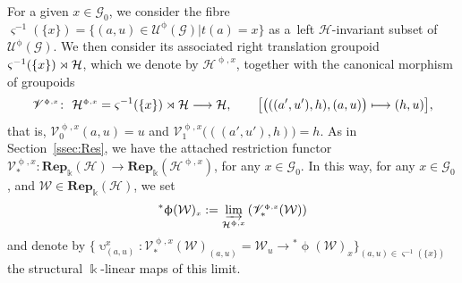 \documentclass[pdftex]{sigma}
\numberwithin{equation}{section}
\newcommand{\Rep}[1]{\mathbf{Rep}_{\Sscript{\Bbbk}}(#1)}
\newcommand{\Go}{\cG_{\Sscript{0}}}
\newcommand{\uU}{\mathscr{U}}
\newcommand{\vV}{\mathscr{V}}
\newcommand{\cG}{{\mathcal G}}
\newcommand{\cH}{{\mathcal H}}
\newcommand{\cW}{{\mathcal W}}
\newcommand{\Sscript}[1]{\scriptscriptstyle{#1}}
\newcommand{\injlimit}[2]{\varinjlim_{#1}\left({#2}\right)}
\newcommand{\upg}{\uU^{\Sscript{\upphi}}(\cG)}
\begin{document}
For a given $x \in\Go$, we consider the fibre $\varsigma^{-1}(\{x\})=\big\{ (a,u) \in \upg| t(a)=x \big\}$ as a~left $\cH$-invariant subset of $\upg$. We then consider its associated right translation groupoid $\varsigma^{-1}(\{x\}) \rJoin \cH$, which we denote by $\cH^{\Sscript{\upphi, x}}$, together with the canonical morphism of groupoids
\begin{gather*}
\vV^{\Sscript{\upphi, x}}\colon \ \cH^{\Sscript{\upphi, x}}= \varsigma^{-1}(\{x\}) \rJoin \cH \longrightarrow \cH, \qquad \big[ \big( ((a',u'),h), (a,u)\big) \longmapsto (h,u) \big],
\end{gather*}
that is, $\vV^{\Sscript{\upphi, x}}_{\Sscript{0}}(a,u)=u$ and $\vV^{\Sscript{\upphi, x}}_{\Sscript{1}}\big( ((a',u'),h) \big)=h$. As in Section~\ref{ssec:Res}, we have the attached restriction
functor $\vV^{\Sscript{\upphi, x}}_*\colon \Rep{\cH} \to \Rep{\cH^{\Sscript\upphi, x}}$, for any $x \in \Go$.
In this way, for any $x \in \Go$, and $\cW \in \Rep{\cH}$, we set\begin{gather}\label{Eq:SPx} {}^*\upphi(\cW)_{\Sscript{x}}: = \injlimit{\cH^{\Sscript{\upphi,
x}}}{\vV^{\Sscript{\upphi, x}}_*(\cW)}
\end{gather}
and denote by $\big\{\upupsilon^{\Sscript{x}}_{\Sscript{(a, u)}}\colon \vV^{\Sscript{\upphi, x}}_*(\cW)_{\Sscript{(a, u)}}=\cW_{\Sscript{u}} \longrightarrow {}^*\upphi(\cW)_{\Sscript{x}} \big\}_{\Sscript{(a, u) \in \varsigma^{-1}(\{x\})}}$ the structural $\Bbbk$-linear maps of this limit.
\end{document}
